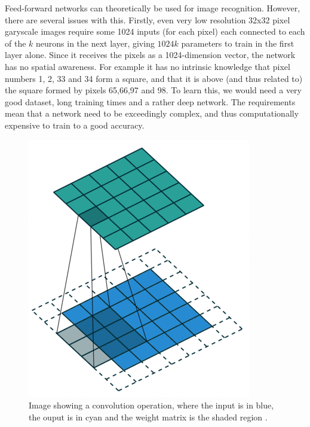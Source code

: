 Feed-forward networks can theoretically be used for image recognition. However, there are several issues with this. Firstly, even very low resolution 32x32 pixel garyscale images require some 1024 inputs (for each pixel) each connected to each of the $k$ neurons in the next layer, giving $1024k$ parameters to train in the first layer alone. Since it receives the pixels as a 1024-dimension vector, the network has no spatial awareness. For example it has no intrinsic knowledge that pixel numbers 1, 2, 33 and 34 form a square, and that it is above (and thus related to) the square formed by pixels 65,66,97 and 98. To learn this, we would need a very good dataset, long training times and a rather deep network. The requirements mean that a network need to be exceedingly complex, and thus computationally expensive to train to a good accuracy.

\begin{figure}[h!]
\centering
\includegraphics[scale=0.45]{pictures/conv}
\caption{Image showing a convolution operation, where the input is in blue, the ouput is in cyan and the weight matrix is the shaded region \cite{convPics}.}
\label{fig:conv}
\end{figure}

